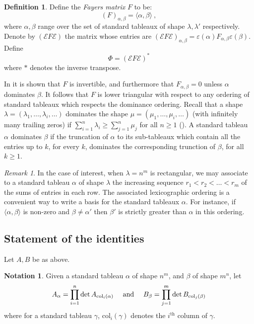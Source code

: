 \documentclass[10pt]{amsart}
\theoremstyle{definition}
\newtheorem{defn}[thm]{Definition}
\newtheorem{notation}[thm]{Notation}
\theoremstyle{remark}
\newtheorem{rem}[thm]{Remark}
\numberwithin{equation}{section}
\newcommand{\lf}{\langle}
\newcommand{\rf}{\rangle}
\newcommand{\0}{\color{blue}{\mathsf{0}}}
\begin{document}
 \begin{defn}  Define the \emph{Fayers matrix} $F$ to be:
 \[ (F)_{\alpha, \beta} = \lf \alpha,\beta \rf \ , \]
 where $\alpha, \beta$ range over the set of standard tableaux of shape $\lambda, \lambda'$ respectively. 
 Denote by $(\mathcal{E} F \mathcal{E})$  the matrix whose entries are $(\mathcal{E} F \mathcal{E})_{\alpha, \beta} = \varepsilon(\alpha) F_{\alpha,\beta} \varepsilon(\beta)$.  Define
  \begin{equation} 
 \Phi =  ( \mathcal{E} F\mathcal{E})^* 
 \end{equation} 
 where $*$ denotes the inverse transpose. 
  \end{defn} 
 In \cite[Lemma 4.5]{Fayers} it is shown that $F$ is invertible, and furthermore  that 
 $F_{\alpha, \beta}=0$ unless $\alpha$ dominates $\beta$.  It follows that  $F$ is lower triangular with respect to any ordering of standard tableaux which respects the dominance ordering. Recall that a shape $\lambda= (\lambda_1,\ldots, \lambda_i,\ldots )$ dominates the shape  $\mu=(\mu_1,\ldots, \mu_i,\ldots)$ (with infinitely many trailing zeros)  if $\sum_{i=1}^n \lambda_i \geq \sum_{j=1}^n 
 \mu_j$ for all $n\geq 1$ (\cite[Definition 3.2]{James}). 
 A standard  tableau $\alpha$   dominates $\beta$ if the truncation of  $\alpha$ to its sub-tableaux which contain all the entries up to $k$, for every $k$, dominates the corresponding trunction of  $\beta$, for all $k\geq 1$. 
 
 
 \begin{rem} In the case of interest,  when $\lambda=n^m$ is  rectangular, we may associate to a standard tableau $\alpha$ of shape $\lambda$ the increasing sequence $r_1<r_2<\ldots< r_m$ of the sums of entries in each row. The associated lexicographic ordering is a convenient way to write a basis for the  standard tableaux $\alpha$.  For instance, if $\lf \alpha, \beta \rf$ is non-zero and $\beta \neq \alpha'$ then  $\beta'$ is strictly greater than $\alpha$ in this ordering. \end{rem} 
 

\subsection{Statement of the  identities} 
Let $A, B$ be as above. 
\begin{notation} Given a standard tableau $\alpha$ of shape $n^m$,  and $\beta$ of shape $m^n$, let 
\[ A_{\alpha } =   \prod_{i=1}^n \det A_{\mathrm{col}_i(\alpha)} \quad \hbox{ and } \quad B_{\beta} = \prod_{j=1}^m \det B_{\mathrm{col}_j(\beta)}\]
where for a standard tableau $\gamma$,
 $\mathrm{col}_i(\gamma)$ denotes  the $i^\mathrm{th}$ column of $\gamma$.

\end{notation} 
\end{document}
